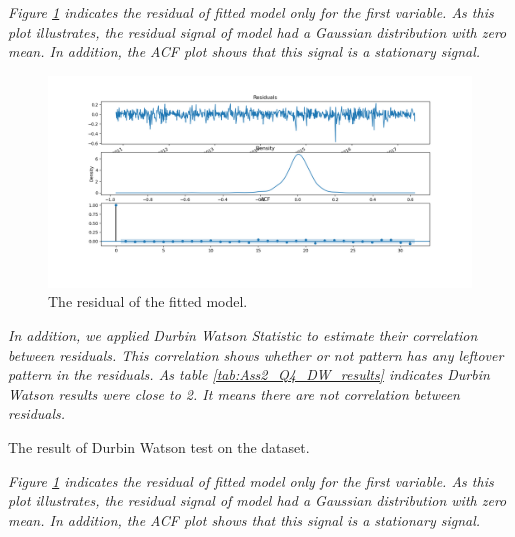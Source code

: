 \textit{Figure \ref{fig:Ass2_Q4_residual_plot} indicates the residual of fitted model only for the first variable. As this plot illustrates, the residual signal of model had a Gaussian distribution with zero mean. In addition, the \gls{ACF} plot shows that this signal is a stationary signal.}



\begin{figure}[H]
    \centering
    \begin{minipage}[b]{1\textwidth}
        \includegraphics[width=\textwidth]{manuscript/src/figures/Ass2/Ass2_Q4_residual_plot.png}
    \end{minipage}
    \caption{The residual of the fitted model.}
    \label{fig:Ass2_Q4_residual_plot}
\end{figure}


\textit{In addition, we applied Durbin Watson Statistic to estimate their correlation between residuals. This correlation shows whether or not pattern has any leftover pattern in the residuals. As table \ref{tab:Ass2_Q4_DW_results} indicates Durbin Watson results were close to 2. It means there are not correlation between residuals. } 

\begin{table}[H]
\centering
\caption{The result of Durbin Watson test on the dataset.}
\label{tab:Ass2_Q4_DW_results}

\end{table}




\textit{Figure \ref{fig:Ass2_Q4_residual_plot} indicates the residual of fitted model only for the first variable. As this plot illustrates, the residual signal of model had a Gaussian distribution with zero mean. In addition, the \gls{ACF} plot shows that this signal is a stationary signal.}




